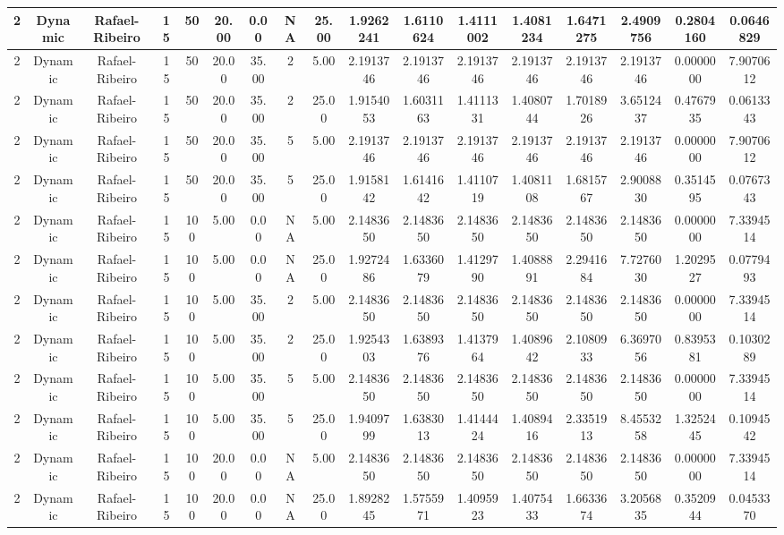 \begin{longtable}{ | c | c | c | c | c | c | c | c | c | c | c | c | c | c | c | c | c | }
	\hline
	2	&	Dynamic	&	Rafael-Ribeiro	&	15	&	50	&	20.00	&	0.00	&	NA	&	25.00	&	1.9262241	&	1.6110624	&	1.4111002	&	1.4081234	&	1.6471275	&	2.4909756	&	0.2804160	&	0.0646829 \\
	\hline
	2	&	Dynamic	&	Rafael-Ribeiro	&	15	&	50	&	20.00	&	35.00	&	2	&	5.00	&	2.1913746	&	2.1913746	&	2.1913746	&	2.1913746	&	2.1913746	&	2.1913746	&	0.0000000	&	7.9070612 \\
	\hline
	2	&	Dynamic	&	Rafael-Ribeiro	&	15	&	50	&	20.00	&	35.00	&	2	&	25.00	&	1.9154053	&	1.6031163	&	1.4111331	&	1.4080744	&	1.7018926	&	3.6512437	&	0.4767935	&	0.0613343 \\
	\hline
	2	&	Dynamic	&	Rafael-Ribeiro	&	15	&	50	&	20.00	&	35.00	&	5	&	5.00	&	2.1913746	&	2.1913746	&	2.1913746	&	2.1913746	&	2.1913746	&	2.1913746	&	0.0000000	&	7.9070612 \\
	\hline
	2	&	Dynamic	&	Rafael-Ribeiro	&	15	&	50	&	20.00	&	35.00	&	5	&	25.00	&	1.9158142	&	1.6141642	&	1.4110719	&	1.4081108	&	1.6815767	&	2.9008830	&	0.3514595	&	0.0767343 \\
	\hline
	2	&	Dynamic	&	Rafael-Ribeiro	&	15	&	100	&	5.00	&	0.00	&	NA	&	5.00	&	2.1483650	&	2.1483650	&	2.1483650	&	2.1483650	&	2.1483650	&	2.1483650	&	0.0000000	&	7.3394514 \\
	\hline
	2	&	Dynamic	&	Rafael-Ribeiro	&	15	&	100	&	5.00	&	0.00	&	NA	&	25.00	&	1.9272486	&	1.6336079	&	1.4129790	&	1.4088891	&	2.2941684	&	7.7276030	&	1.2029527	&	0.0779493 \\
	\hline
	2	&	Dynamic	&	Rafael-Ribeiro	&	15	&	100	&	5.00	&	35.00	&	2	&	5.00	&	2.1483650	&	2.1483650	&	2.1483650	&	2.1483650	&	2.1483650	&	2.1483650	&	0.0000000	&	7.3394514 \\
	\hline
	2	&	Dynamic	&	Rafael-Ribeiro	&	15	&	100	&	5.00	&	35.00	&	2	&	25.00	&	1.9254303	&	1.6389376	&	1.4137964	&	1.4089642	&	2.1080933	&	6.3697056	&	0.8395381	&	0.1030289 \\
	\hline
	2	&	Dynamic	&	Rafael-Ribeiro	&	15	&	100	&	5.00	&	35.00	&	5	&	5.00	&	2.1483650	&	2.1483650	&	2.1483650	&	2.1483650	&	2.1483650	&	2.1483650	&	0.0000000	&	7.3394514 \\
	\hline
	2	&	Dynamic	&	Rafael-Ribeiro	&	15	&	100	&	5.00	&	35.00	&	5	&	25.00	&	1.9409799	&	1.6383013	&	1.4144424	&	1.4089416	&	2.3351913	&	8.4553258	&	1.3252445	&	0.1094542 \\
	\hline
	2	&	Dynamic	&	Rafael-Ribeiro	&	15	&	100	&	20.00	&	0.00	&	NA	&	5.00	&	2.1483650	&	2.1483650	&	2.1483650	&	2.1483650	&	2.1483650	&	2.1483650	&	0.0000000	&	7.3394514 \\
	\hline
	2	&	Dynamic	&	Rafael-Ribeiro	&	15	&	100	&	20.00	&	0.00	&	NA	&	25.00	&	1.8928245	&	1.5755971	&	1.4095923	&	1.4075433	&	1.6633674	&	3.2056835	&	0.3520944	&	0.0453370 \\

\end{longtable}
